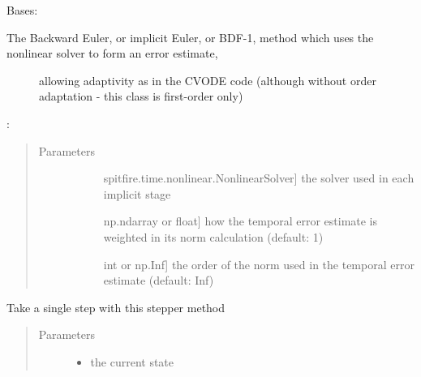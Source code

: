 \documentclass[letterpaper,10pt,english]{sphinxmanual}
\begin{document}
\begin{fulllineitems}
\label{\detokenize{spitfire.time.methods:spitfire.time.methods.BackwardEulerWithError}}
Bases: {\hyperref[\detokenize{spitfire.time.methods:spitfire.time.methods.AdaptiveImplicitTimeStepper}]{}}
\begin{description}
\item[{The Backward Euler, or implicit Euler, or BDF-1, method which uses the nonlinear solver to form an error estimate,}] \leavevmode
allowing adaptivity as in the CVODE code (although without order adaptation - this class is first-order only)

\end{description}

:
\begin{quote}\begin{description}
\item[{Parameters}] \leavevmode\begin{description}
\item[{}] \leavevmode{[}spitfire.time.nonlinear.NonlinearSolver{]}
the solver used in each implicit stage

\item[{}] \leavevmode{[}np.ndarray or float{]}
how the temporal error estimate is weighted in its norm calculation (default: 1)

\item[{}] \leavevmode{[}int or np.Inf{]}
the order of the norm used in the temporal error estimate (default: Inf)

\end{description}

\end{description}\end{quote}

\begin{fulllineitems}
\label{\detokenize{spitfire.time.methods:spitfire.time.methods.BackwardEulerWithError.single_step}}
Take a single step with this stepper method
\begin{quote}\begin{description}
\item[{Parameters}] \leavevmode\begin{itemize}
\item {} 
 \textendash{} the current state


\end{itemize}
\end{description}
\end{quote}
\end{fulllineitems}
\end{fulllineitems}
\end{document}
